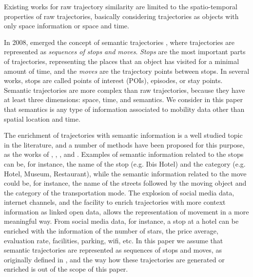 \documentclass[12pt]{article}
\begin{document}
Existing works for raw trajectory similarity are limited to the spatio-temporal properties of raw trajectories, basically considering trajectories as objects with only space information or space and time.

In 2008, emerged the concept of semantic trajectories \citep{Spaccapietra:2008:CVT:1347466.1347785}, where trajectories are represented as \emph{sequences of stops and moves}. \emph{Stops} are the most important parts of trajectories, representing the places that an object has visited for a minimal amount of time, and the \emph{moves} are the trajectory points between stops. In several works, stops are called points of interest (POIs), episodes, or stay points. Semantic trajectories are more complex than raw trajectories, because they have at least three dimensions: space, time, and semantics. {We consider in this paper that semantics is any type of information associated to mobility data other than spatial location and time.}

{The enrichment of trajectories with semantic information is a well studied topic in the literature, and a number of methods have been proposed for this purpose, as the works of} \cite{alvares2007model}, \cite{Palma2008}, \cite{manso}, and \cite{fileto2013baquara}. {Examples of semantic information related to the stops can be, for instance, the name of the stop (e.g. Ibis Hotel) and the category (e.g. Hotel, Museum, Restaurant), while the semantic information related to the move could be, for instance, the name of the streets followed by the moving object and the category of the transportation mode. The explosion of social media data, internet channels, and the facility to enrich trajectories with more context information as linked open data, allows the representation of movement in a more meaningful way. From social media data, for instance, a stop at a hotel can be enriched with the information of the number of stars, the price average, evaluation rate, facilities, parking, wifi, etc.  In this paper we assume that semantic trajectories are represented as sequences of stops and moves, as originally defined in }\cite{Spaccapietra:2008:CVT:1347466.1347785}{, and the way how these trajectories are generated or enriched is out of the scope of this paper.}
\end{document}

